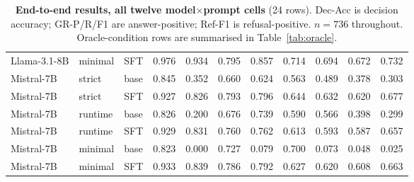 \begin{table}[htbp]
{\begin{tabular}{@{}lll rrrrr rrr@{}}
Llama-3.1-8B & minimal & SFT & 0.976 & 0.934 & 0.795 & 0.857 & 0.714 & 0.694 & 0.672 & 0.732\\
Mistral-7B & strict & base & 0.845 & 0.352 & 0.660 & 0.624 & 0.563 & 0.489 & 0.378 & 0.303\\
Mistral-7B & strict & SFT & 0.927 & 0.826 & 0.793 & 0.796 & 0.644 & 0.632 & 0.620 & 0.677\\
Mistral-7B & runtime & base & 0.826 & 0.200 & 0.676 & 0.739 & 0.590 & 0.566 & 0.398 & 0.299\\
Mistral-7B & runtime & SFT & 0.929 & 0.831 & 0.760 & 0.762 & 0.613 & 0.593 & 0.587 & 0.657\\
Mistral-7B & minimal & base & 0.823 & 0.000 & 0.727 & 0.079 & 0.700 & 0.073 & 0.048 & 0.025\\
Mistral-7B & minimal & SFT & 0.933 & 0.839 & 0.786 & 0.792 & 0.627 & 0.620 & 0.608 & 0.663\\
\bottomrule\end{tabular}}
\caption{\textbf{End-to-end results, all twelve model$\times$prompt cells} (24 rows). Dec-Acc is decision accuracy; GR-P/R/F1 are answer-positive; Ref-F1 is refusal-positive. $n=736$ throughout. Oracle-condition rows are summarised in Table~\ref{tab:oracle}.}\label{tab:full}
\end{table}
